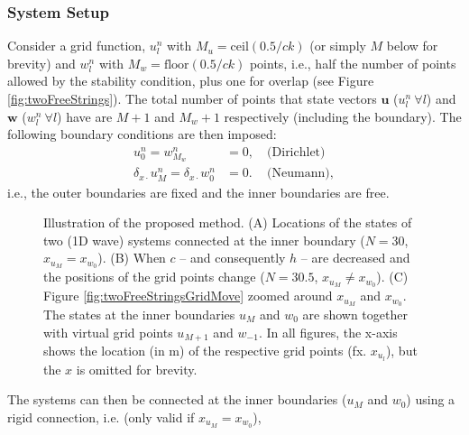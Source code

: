 \documentclass[dvipsnames, reprint]{JASA}
\def\SWcomment[#1]{\textcolor{Bittersweet}{#1}}
\begin{document}
\subsubsection{System Setup}\label{sec:systSetup}
Consider a grid function, $u_l^n$ with $M_u = \text{ceil}(0.5/ck)$ (or simply $M$ below for brevity) and $w_l^n$ with $M_w = \text{floor}(0.5/ck)$ points, i.e., half the number of points allowed by the stability condition, plus one for overlap (see Figure \ref{fig:twoFreeStrings}). The total number of points that state vectors $\mathbf{u}$ ($u_l^n\ \forall l$) and $\mathbf{w}$ ($w_l^n\ \forall l$) have are $M + 1$ and $M_{w} + 1$ respectively (including the boundary). The following boundary conditions are then imposed:
\begin{equation}\label{eq:halfStringBoundaryCond}
    \begin{aligned}
        u_0^n = w_{M_w}^n &= 0,\quad \text{(Dirichlet)}\\
        \delta_{x\cdot}u_M^n = \delta_{x\cdot}w_0^n &= 0.\, \quad\text{(Neumann)},
    \end{aligned}
\end{equation}
i.e., the outer boundaries are fixed and the inner boundaries are free.
%
\begin{figure}[h]
\caption{Illustration of the proposed method. (A) Locations of the states of two (1D wave) systems connected at the inner boundary ($N = 30$, $x_{u_M} = x_{w_0}$). (B) When $c$ -- and consequently $h$ -- are decreased and the positions of the grid points change ($N = 30.5$, $x_{u_M} \neq x_{w_0}$). (C) Figure \ref{fig:twoFreeStringsGridMove} zoomed around $x_{u_M}$ and $x_{w_0}$. The states at the inner boundaries $u_M$ and $w_0$ are shown together with virtual grid points $u_{M+1}$ and $w_{-1}$. In all figures, the x-axis shows the location (in m) of the respective grid points (fx. $x_{u_l}$), but the $x$ is omitted for brevity.}
\end{figure}
%
The systems can then be connected at the inner boundaries ($u_M$ and $w_0$) using a rigid connection, i.e. \SWcomment[(only valid if $x_{u_M} = x_{w_0}$)],
\end{document}
